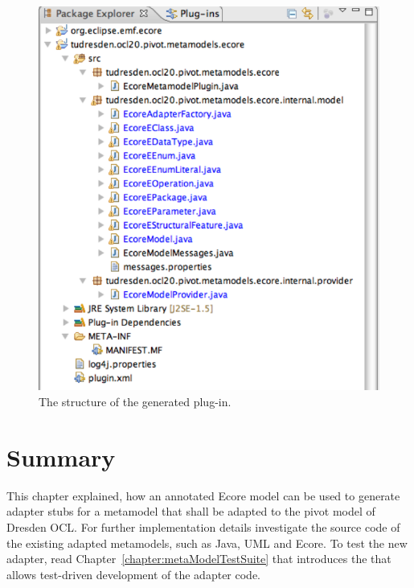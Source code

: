 \begin{figure}[!htbp]
	\centering
	\includegraphics[width=0.7\linewidth]{figures/pivotModelAdaption/GeneratedPlugin}
	\caption{The structure of the generated plug-in.}
	\label{pic:pivotModelAdaption:GeneratedPlugin}
\end{figure}



\section{Summary}

This chapter explained, how an annotated Ecore model can be used to generate 
adapter stubs for a metamodel that shall be adapted to the pivot model of
Dresden OCL. For further implementation details investigate the source code of
the existing adapted metamodels, such as Java, \acs{UML} and Ecore. To test 
the new adapter, read Chapter~\ref{chapter:metaModelTestSuite} that introduces 
the  that allows test-driven development 
of the adapter code.
